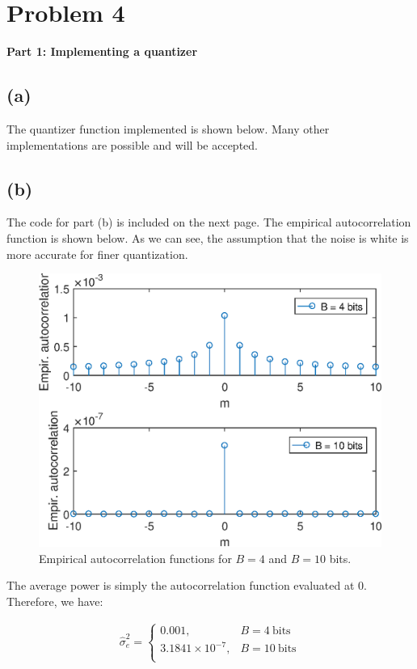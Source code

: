 \documentclass{article}
\begin{document}
\section{Problem 4}

\noindent\textbf{Part 1: Implementing a quantizer}
\subsection{(a)}

The quantizer function implemented is shown below. Many other implementations are possible and will be accepted.



\subsection{(b)}

The code for part (b) is included on the next page. The empirical autocorrelation function is shown below. As we can see, the assumption that the noise is white is more accurate for finer quantization.

\begin{figure}[h!]
	\centering
	\includegraphics[scale=0.7]{figs/hw03_q4_empir_xcorr.eps}
	\caption{Empirical autocorrelation functions for $B = 4$ and $B = 10$ bits.}
\end{figure}

The average power is simply the autocorrelation function evaluated at 0. Therefore, we have:

\begin{align*}
\hat{\sigma}_e^2 = \begin{cases}
0.001, & B = 4~\text{bits} \\
3.1841\times 10^{-7}, & B = 10~\text{bits} \\
\end{cases}
\end{align*}
\end{document}
